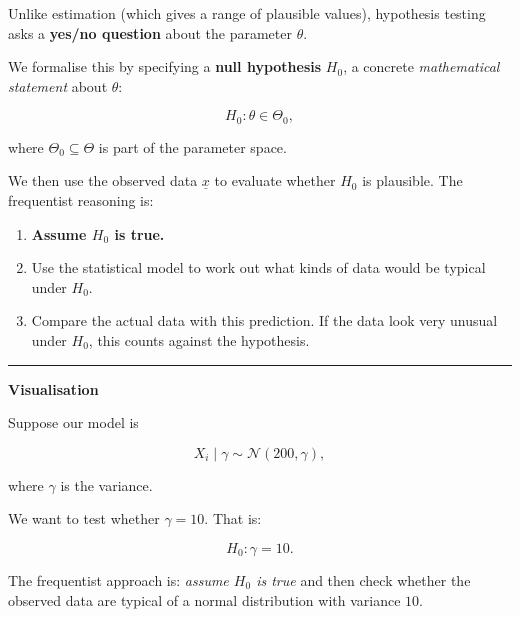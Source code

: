 \documentclass[
  letterpaper,
  DIV=11,
  numbers=noendperiod]{scrreprt}
\providecommand{\tightlist}{%
  \setlength{\itemsep}{0pt}\setlength{\parskip}{0pt}}
\theoremstyle{definition}
\theoremstyle{plain}
\theoremstyle{definition}
\theoremstyle{remark}
\begin{document}
Unlike estimation (which gives a range of plausible values), hypothesis
testing asks a \textbf{yes/no question} about the parameter \(\theta\).

We formalise this by specifying a \textbf{null hypothesis} \(H_0\), a
concrete \emph{mathematical statement} about \(\theta\):

\[
H_0 : \theta \in \Theta_0,
\]

where \(\Theta_0 \subseteq \Theta\) is part of the parameter space.

We then use the observed data \(\underline{x}\) to evaluate whether
\(H_0\) is plausible. The frequentist reasoning is:

\begin{enumerate}
\def\labelenumi{\arabic{enumi}.}
\tightlist
\item
  \textbf{Assume \(H_0\) is true.}
\item
  Use the statistical model to work out what kinds of data would be
  typical under \(H_0\).
\item
  Compare the actual data with this prediction. If the data look very
  unusual under \(H_0\), this counts against the hypothesis.
\end{enumerate}

\begin{center}\rule{0.5\linewidth}{0.5pt}\end{center}

\textbf{Visualisation}

Suppose our model is

\[
X_i \mid \gamma \sim \mathcal{N}(200, \gamma),
\]

where \(\gamma\) is the variance.

We want to test whether \(\gamma = 10\). That is:

\[
H_0: \gamma = 10.
\]

The frequentist approach is: \emph{assume \(H_0\) is true} and then
check whether the observed data are typical of a normal distribution
with variance \(10\).
\end{document}
